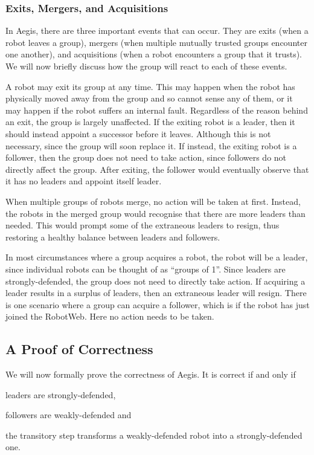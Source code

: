 \subsubsection{Exits, Mergers, and Acquisitions}
In Aegis, there are three important events that can occur. They are exits (when a robot leaves a group), mergers (when multiple mutually trusted groups encounter one another), and acquisitions (when a robot encounters a group that it trusts). We will now briefly discuss how the group will react to each of these events.

A robot may exit its group at any time. This may happen when the robot has physically moved away from the group and so cannot sense any of them, or it may happen if the robot suffers an internal fault. Regardless of the reason behind an exit, the group is largely unaffected. If the exiting robot is a leader, then it should instead appoint a successor before it leaves. Although this is not necessary, since the group will soon replace it. If instead, the exiting robot is a follower, then the group does not need to take action, since followers do not directly affect the group. After exiting, the follower would eventually observe that it has no leaders and appoint itself leader.

When multiple groups of robots merge, no action will be taken at first. Instead, the robots in the merged group would recognise that there are more leaders than needed. This would prompt some of the extraneous leaders to resign, thus restoring a healthy balance between leaders and followers.

In most circumstances where a group acquires a robot, the robot will be a leader, since individual robots can be thought of as ``groups of 1''. Since leaders are strongly-defended, the group does not need to directly take action. If acquiring a leader results in a surplus of leaders, then an extraneous leader will resign. There is one scenario where a group can acquire a follower, which is if the robot has just joined the RobotWeb. Here no action needs to be taken.

\subsection{A Proof of Correctness} \label{section:proof-correctness}
We will now formally prove the correctness of Aegis. It is correct if and only if \begin{enumerate*}
    \item leaders are strongly-defended, 
    \item followers are weakly-defended and
    \item the transitory step transforms a weakly-defended robot into a strongly-defended one.
\end{enumerate*}
